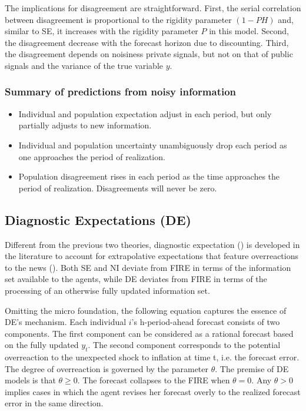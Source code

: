 \documentclass[12pt]{article}
\begin{document}
	The implications for disagreement are straightforward. First, the serial correlation between disagreement is proportional to the rigidity parameter $(1-PH)$ and, similar to SE, it increases with the rigidity parameter $P$ in this model. Second, the disagreement decrease with the forecast horizon due to discounting. Third, the disagreement depends on noisiness private signals, but not on that of public signals and the variance of the true variable $y$. 
	
	\subsubsection{Summary of predictions from noisy information}
	
	\begin{itemize}
		\item Individual and population expectation adjust in each period, but only partially adjusts to new information. 
		\item  Individual and population uncertainty unambiguously drop each period as one approaches the period of realization.  
		\item  Population disagreement rises in each period as the time approaches the period of realization. Disagreements will never be zero. 
	\end{itemize}
	
	\subsection{Diagnostic Expectations (DE)}
	
	Different from the previous two theories, diagnostic expectation (\cite{bordalo2018diagnostic}) is developed in the literature to account for extrapolative expectations that feature overreactions to the news  (\cite{bordalo2018over}). Both SE and NI deviate from FIRE in terms of the information set available to the agents, while DE deviates from FIRE in terms of the processing of an otherwise fully updated information set. 		

Omitting the micro foundation, the following equation captures the essence of DE's mechanism. Each individual $i$'s h-period-ahead forecast consists of two components. The first component can be considered as a rational forecast based on the fully updated $y_t$. The second component corresponds to the potential overreaction to the unexpected shock to inflation at time t, i.e. the forecast error. The degree of overreaction is governed by the parameter $\theta$. The premise of DE models is that $\theta \geq 0$. The forecast collapses to the FIRE when $\theta = 0$. Any $\theta>0$ implies cases in which the agent revises her forecast overly to the realized forecast error in the same direction.
\end{document}
